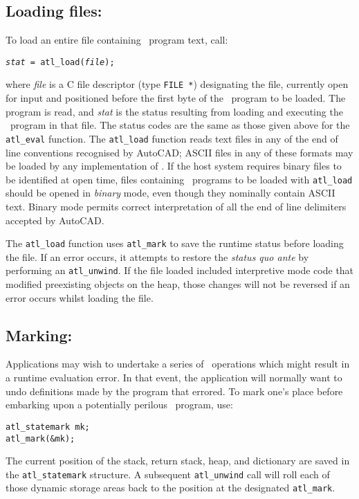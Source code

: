 \documentclass[twocolumn]{article}
\begin{document}
\subsection{Loading files: }

To load an entire file containing \atlast\ program text, call:

{\tt {\em stat} = \verb+atl_load+({\em file});}

where {\em file} is a C file descriptor (type {\tt FILE *})
designating the file, currently open for input and positioned before
the first byte of the \atlast\ program to be loaded.  The
program is read, and {\em stat} is the status resulting from
loading and executing the \atlast\ program in that file.  The status
codes are the same as those given above for the \verb+atl_eval+
function.  The \verb+atl_load+ function reads text files in any of the end
of line conventions recognised by AutoCAD; ASCII files in any of these
formats may be loaded by any implementation of \atlast .  If the host
system requires binary files to be identified at open time, files
containing \atlast\ programs to be loaded with \verb+atl_load+ should
be opened in {\em binary} mode, even though they nominally contain ASCII
text.  Binary mode permits correct interpretation of all the end of
line delimiters accepted by AutoCAD\@.

The \verb+atl_load+ function uses \verb+atl_mark+ to save the runtime
status before loading the file.  If an error occurs, it attempts to
restore the {\em status quo ante} by performing an \verb+atl_unwind+.
If the file loaded included interpretive mode code that modified
preexisting objects on the heap, those changes will not be reversed if
an error occurs whilst loading the file.

\subsection{Marking: }

Applications may wish to undertake a series of \atlast\ operations
which might result in a runtime evaluation error.  In that event, the
application will normally want to undo definitions made by the
program that errored.  To mark one's place before embarking upon a
potentially perilous \atlast\ program, use:

{\tt \verb+atl_statemark+ mk;\\
\verb+atl_mark(&mk);+}

The current position of the stack, return stack, heap, and dictionary
are saved in the \verb+atl_statemark+ structure.  A subsequent
\verb+atl_unwind+ call will roll each of those dynamic storage areas
back to the position at the designated \verb+atl_mark+.
\end{document}
